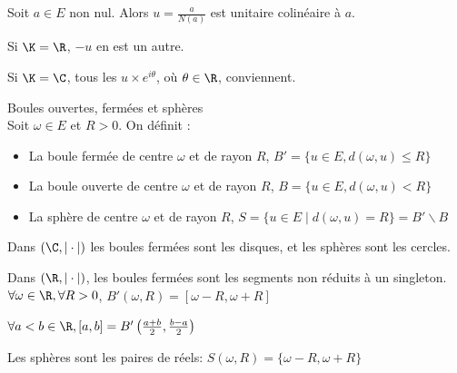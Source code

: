 \begin{exemple}
    Soit $a \in E$ non nul. 
    Alors $u = \frac{a }{N(a)}$ est unitaire colinéaire à $a$. 

    Si $\K = \R$, $-u$ en est un autre. 

    Si $\K = \C$, tous les $u \times e^{i \theta}$, où $\theta \in \R$, conviennent. 
\end{exemple}


\begin{definition}{Boules ouvertes, fermées et sphères}{}
    \\Soit $\omega \in E$ et $R > 0$. On définit : 
    \begin{itemize}
        \item La boule fermée de centre $\omega$ et de rayon $R$, $B' = \{u \in E, d(\omega, u) \leqslant R\}$
        \item La boule ouverte de centre $\omega$ et de rayon $R$, $B = \{u \in E, d(\omega, u) < R\}$
        \item La sphère de centre $\omega$ et de rayon $R$, $S = \{u \in E \mid d(\omega, u) = R\} = B' \backslash B$
    \end{itemize}  
\end{definition}

\begin{exemple}
    Dans $(\C, |\cdot|)$ les boules fermées sont les disques, et les sphères sont les cercles. 

    Dans $(\R, |\cdot|)$, les boules fermées sont les segments non 
    réduits à un singleton. \\
    
    $\forall \omega \in \R, \forall R > 0$, $B'(\omega, R) = \left[\omega - R, \omega + R\right]$

    $\forall a < b \in \R, \left[a, b \right] = B'\left(\frac{a + b} 2, \frac{b - a} 2\right)$

    Les sphères sont les paires de réels: $S(\omega, R) = \{\omega - R, \omega + R\}$
\end{exemple}

